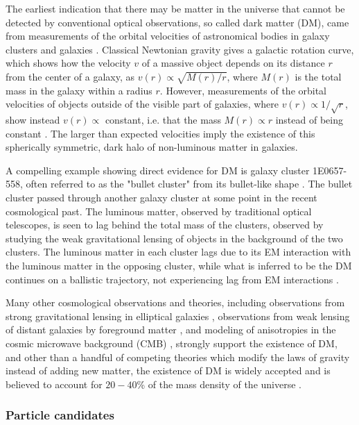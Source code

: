 The earliest indication that there may be matter in the universe that cannot be detected by conventional optical observations, so called dark matter (DM), came from measurements of the orbital velocities of astronomical bodies in galaxy clusters \cite{Kapteyn:1922zz, Zwicky:1937zza} and galaxies \cite{Rubin:1970zza, Rubin:1980zd}. Classical Newtonian gravity gives a galactic rotation curve, which shows how the velocity $v$ of a massive object depends on its distance $r$ from the center of a galaxy, as $v(r) \propto \sqrt{M(r)/r}$, where $M(r)$ is the total mass in the galaxy within a radius $r$. However, measurements of the orbital velocities of objects outside of the visible part of galaxies, where $v(r) \propto 1/\sqrt{r}$, show instead $v(r) \propto$ constant, i.e. that the mass $M(r) \propto r$ instead of being constant \cite{Agashe:2014kda}. The larger than expected velocities imply the existence of this spherically symmetric, dark halo of non-luminous matter in galaxies. 

\indent A compelling example showing direct evidence for DM is galaxy cluster 1E0657-558, often referred to as the "bullet cluster" from its bullet-like shape \cite{Clowe:2003tk}. The bullet cluster passed through another galaxy cluster at some point in the recent cosmological past. The luminous matter, observed by traditional optical telescopes, is seen to lag behind the total mass of the clusters, observed by studying the weak gravitational lensing of objects in the background of the two clusters. The luminous matter in each cluster lags due to its EM interaction with the luminous matter in the opposing cluster, while what is inferred to be the DM continues on a ballistic trajectory, not experiencing lag from EM interactions \cite{Agashe:2014kda}. 

Many other cosmological observations and theories, including observations from strong gravitational lensing in elliptical galaxies \cite{Koopmans:2002qh}, observations from weak lensing of distant galaxies by foreground matter \cite{Hoekstra:2002nf}, and modeling of anisotropies in the cosmic microwave background (CMB) \cite{Hu:2001bc, Hu:1996qs}, strongly support the existence of DM, and other than a handful of competing theories which modify the laws of gravity instead of adding new matter, the existence of DM is widely accepted \cite{Bertone:2004pz} and is believed to account for $20-40$\% of the mass density of the universe \cite{Bergstrom:2000pn}.

\subsubsection{Particle candidates}

